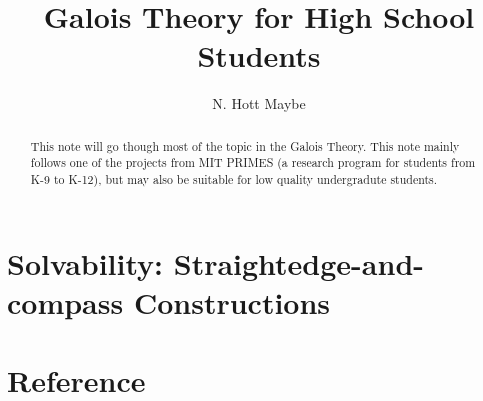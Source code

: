 \documentclass{article}
\title{\textbf{Galois Theory for High School Students}}
\author{N. Hott Maybe}
\theoremstyle{definition}
\begin{document}
    \maketitle
    \begin{abstract}
        This note will go though most of the topic in the Galois Theory. This note mainly follows one of the projects from MIT PRIMES (a research program for students from K-9 to K-12), but may also be suitable for low quality undergradute students.
    \end{abstract}
    \tableofcontents
    \newpage
    
    
    
    
    
    
    
    \section{Solvability: Straightedge-and-compass Constructions}
    \section{Reference}
\end{document}
